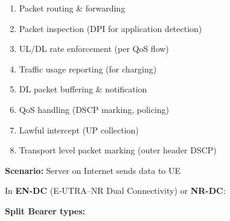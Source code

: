 
\begin{enumerate}
\def\labelenumi{\arabic{enumi}.}
\tightlist
\item
  Packet routing \& forwarding
\item
  Packet inspection (DPI for application detection)
\item
  UL/\allowbreak{}DL rate enforcement (per QoS flow)
\item
  Traffic usage reporting (for charging)
\item
  DL packet buffering \& notification
\item
  QoS handling (DSCP marking, policing)
\item
  Lawful intercept (UP collection)
\item
  Transport level packet marking (outer header DSCP)
\end{enumerate}



\textbf{Scenario:} Server on Internet sends data to UE









\CNchained{}

In \textbf{EN-DC} (E-UTRA–NR Dual Connectivity) or \textbf{NR-DC}:



\textbf{Split Bearer types:}

